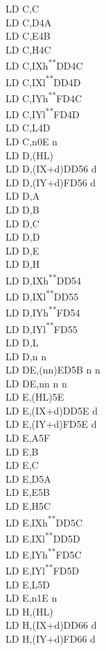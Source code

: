 \documentclass[twoside,openright,a4paper]{book}
\newcommand{\UNDOC}{\textnormal{\textsuperscript{**}}}
\begin{document}
\begin{multicols}{3}
{\begin{tabbing}
	LD C,C\\
	LD C,D\>4A\\
	LD C,E\>4B\\
	LD C,H\>4C\\
	LD C,IXh\UNDOC\>DD4C\\
	LD C,IXl\UNDOC\>DD4D\\
	LD C,IYh\UNDOC\>FD4C\\
	LD C,IYl\UNDOC\>FD4D\\
	LD C,L\>4D\\
	LD C,n\>0E n\\
	LD D,(HL)\\
	LD D,(IX+d)\>DD56 d\\
	LD D,(IY+d)\>FD56 d\\
	LD D,A\\
	LD D,B\\
	LD D,C\\
	LD D,D\\
	LD D,E\\
	LD D,H\\
	LD D,IXh\UNDOC\>DD54\\
	LD D,IXl\UNDOC\>DD55\\
	LD D,IYh\UNDOC\>FD54\\
	LD D,IYl\UNDOC\>FD55\\
	LD D,L\\
	LD D,n n\\
	LD DE,(nn)\>ED5B n n\\
	LD DE,nn n n\\
	LD E,(HL)\>5E\\
	LD E,(IX+d)\>DD5E d\\
	LD E,(IY+d)\>FD5E d\\
	LD E,A\>5F\\
	LD E,B\\
	LD E,C\\
	LD E,D\>5A\\
	LD E,E\>5B\\
	LD E,H\>5C\\
	LD E,IXh\UNDOC\>DD5C\\
	LD E,IXl\UNDOC\>DD5D\\
	LD E,IYh\UNDOC\>FD5C\\
	LD E,IYl\UNDOC\>FD5D\\
	LD E,L\>5D\\
	LD E,n\>1E n\\
	LD H,(HL)\\
	LD H,(IX+d)\>DD66 d\\
	LD H,(IY+d)\>FD66 d\\

\end{tabbing}}
\end{multicols}
\end{document}
